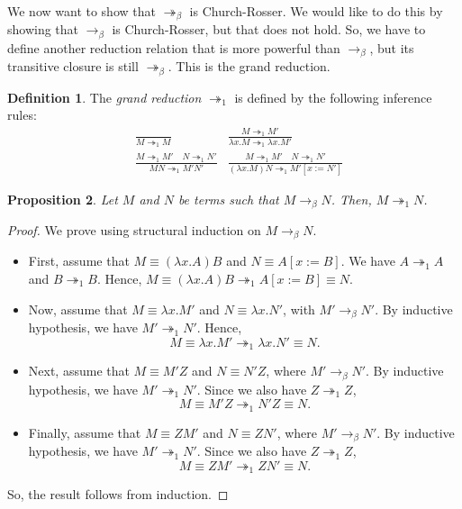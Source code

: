 \documentclass[a4paper, openany]{memoir}
\newtheorem{proposition}{Proposition}[section]
\theoremstyle{definition}
\newtheorem{definition}[proposition]{Definition}
\begin{document}
    We now want to show that $\twoheadrightarrow_\beta$ is Church-Rosser. We would like to do this by showing that $\to_\beta$ is Church-Rosser, but that does not hold. So, we have to define another reduction relation that is more powerful than $\to_\beta$, but its transitive closure is still $\twoheadrightarrow_\beta$. This is the grand reduction.
    \begin{definition}
        The \emph{grand reduction} $\twoheadrightarrow_1$ is defined by the following inference rules:
        \begin{align*}
            & \frac{}{M \twoheadrightarrow_1 M} & \frac{M \twoheadrightarrow_1 M'}{\lambda x.M \twoheadrightarrow_1 \lambda x.M'} \\
            & \frac{M \twoheadrightarrow_1 M' \quad N \twoheadrightarrow_1 N'}{MN \twoheadrightarrow_1 M'N'} & \frac{M \twoheadrightarrow_1 M' \quad N \twoheadrightarrow_1 N'}{(\lambda x.M)N \twoheadrightarrow_1 M'[x := N']}
        \end{align*}
    \end{definition}

    \begin{proposition}
        Let $M$ and $N$ be terms such that $M \to_\beta N$. Then, $M \twoheadrightarrow_1 N$.
    \end{proposition}
    \begin{proof}
        We prove using structural induction on $M \to_\beta N$.
        \begin{itemize}
            \item First, assume that $M \equiv (\lambda x.A)B$ and $N \equiv A[x := B]$. We have $A \twoheadrightarrow_1 A$ and $B \twoheadrightarrow_1 B$. Hence, $M \equiv (\lambda x.A)B \twoheadrightarrow_1 A[x := B] \equiv N$.
            
            \item Now, assume that $M \equiv \lambda x.M'$ and $N \equiv \lambda x.N'$, with $M' \to_\beta N'$. By inductive hypothesis, we have $M' \twoheadrightarrow_1 N'$. Hence, 
            \[M \equiv \lambda x.M' \twoheadrightarrow_1 \lambda x.N' \equiv N.\]

            \item Next, assume that $M \equiv M'Z$ and $N \equiv N'Z$, where $M' \to_\beta N'$. By inductive hypothesis, we have $M' \twoheadrightarrow_1 N'$. Since we also have $Z \twoheadrightarrow_1 Z$, 
            \[M \equiv M'Z \twoheadrightarrow_1 N'Z \equiv N.\]

            \item Finally, assume that $M \equiv ZM'$ and $N \equiv ZN'$, where $M' \to_\beta N'$. By inductive hypothesis, we have $M' \twoheadrightarrow_1 N'$. Since we also have $Z \twoheadrightarrow_1 Z$,
            \[M \equiv ZM' \twoheadrightarrow_1 ZN' \equiv N.\]
        \end{itemize}
        So, the result follows from induction.
    \end{proof}
\end{document}
